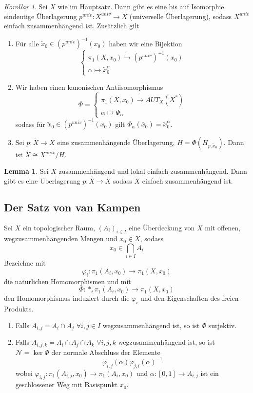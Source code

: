 \documentclass[a4paper, 12pt]{article}
\theoremstyle{plain}
\theoremstyle{definition}
\theoremstyle{lemma}
\newtheorem{lemma}[theorem]{Lemma}
\theoremstyle{remark}
\theoremstyle{corollary}
\newtheorem{corollary}[theorem]{Korollar}
\theoremstyle{example}
\begin{document}
	\begin{corollary}
		Sei $X$ wie im Hauptsatz. Dann gibt es eine bis auf Isomorphie eindeutige Überlagerung $p^{univ}:X^{univ} \to X$ (universelle Überlagerung), sodass $X^{univ}$ einfach zusammenhängend ist. Zusätzlich gilt \begin{enumerate}
			\item Für alle $\tilde{x}_0 \in (p^{univ})^{-1}(x_0)$ haben wir eine Bijektion \[\begin{cases}
				\pi_1(X,x_0) \tilde{\rightarrow} (p^{univ})^{-1}(x_0)\\
				\alpha \mapsto \tilde{x}_0^\alpha
			\end{cases}\]
		\item Wir haben einen kanonischen Antiisomorphismus \[\Phi = \begin{cases}
			\pi_1(X,x_0) \tilde{\rightarrow} AUT_X(X^*)\\
			\alpha \mapsto \Phi_\alpha
		\end{cases}\]
		sodass für $\tilde{x}_0 \in (p^{univ})^{-1}(x_0)$ gilt $\Phi_\alpha(\tilde{x_0}) = \tilde{x}_0^\alpha$.
		\item Sei $p:\tilde{X} \to X$ eine zusammenhängende Überlagerung, $H = \Phi(H_{p,\tilde{x}_0})$. Dann ist $\tilde{X} \cong X^{univ} / H$.
		\end{enumerate}
	\end{corollary}
	\begin{lemma}
		Sei $X$ zusammenhängend und lokal einfach zusammenhängend. Dann gibt es eine Überlagerung $p: \tilde{X} \to X$ sodass $\tilde{X}$ einfach zusammenhängend ist.
	\end{lemma}
\subsection{Der Satz von van Kampen}
	Sei $X$ ein topologischer Raum, $(A_i)_{i \in I}$ eine Überdeckung von $X$ mit offenen, wegzusammenhängenden Mengen und $x_0 \in X$, sodass \[x_0 \in \bigcap_{i \in I} A_i\] Bezeichne mit \[\varphi_i: \pi_1(A_i, x_0) \to \pi_1(X,x_0)\] die natürlichen Homomorphismen und mit \[\Phi: *_i \pi_1(A_i, x_0) \to \pi_1(X,x_0)\] den Homomorphismus induziert durch die $\varphi_i$ und den Eigenschaften des freien Produkts. \begin{enumerate}
		\item Falls $A_{i,j} = A_i \cap A_j$ $\forall i,j \in I$ wegzusammenhängend ist, so ist $\Phi$ surjektiv.
		\item Falls $A_{i,j,k} = A_i \cap A_j \cap A_k$ $\forall i,j,k$ wegzusammenhängend ist, so ist $\mathcal{N} = \ker \Phi$ der normale Abschluss der Elemente \[\varphi_{i,j}(\alpha)\varphi_{j,i}(\alpha)^{-1}\] wobei $\varphi_{i,j}: \pi_1(A_{i,j},x_0) \to \pi_1(A_i,x_0)$ und $\alpha: [0,1]\to A_{i,j}$ ist ein geschlossener Weg mit Basispunkt $x_0$.
	\end{enumerate}
\end{document}
